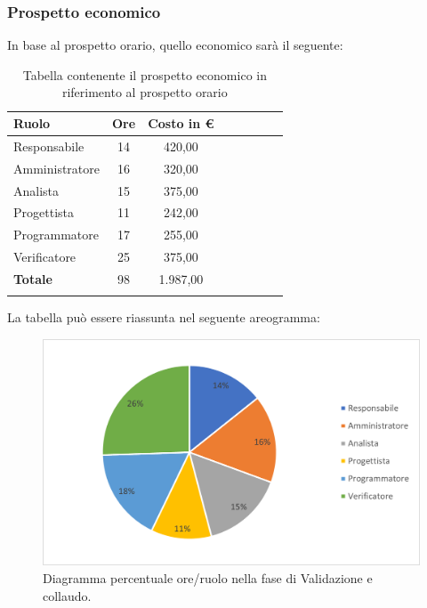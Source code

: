 \subsubsection{Prospetto economico}
In base al prospetto orario, quello economico sarà il seguente:

\begin{longtable}{|l|c|c|c|c|c|c|c|}
	\hline
	\rowcolor{lighter-grayer}
	\textbf{Ruolo}  & \textbf{Ore} & \textbf{Costo in €} \\
	\hline
	\endfirsthead

	\hline
	Responsabile    & 14           & 420,00              \\
	\hline
	\hline
	Amministratore  & 16           & 320,00              \\
	\hline
	\hline
	Analista        & 15           & 375,00              \\
	\hline
	\hline
	Progettista     & 11           & 242,00              \\
	\hline
	\hline
	Programmatore   & 17           & 255,00              \\
	\hline
	\hline
	Verificatore    & 25           & 375,00              \\
	\hline
	\hline
	\textbf{Totale} & 98           & 1.987,00            \\
	\hline
	\rowcolor{white}
	\caption{Tabella contenente il prospetto economico in riferimento al prospetto orario}
\end{longtable}
\pagebreak

La tabella può essere riassunta nel seguente areogramma:
\begin{figure}[H]
	\centering
	\includegraphics[width=0.8\linewidth]{res/images/preventivo/7-2.png}
	\caption{Diagramma percentuale ore/ruolo nella fase di Validazione e collaudo.}
	\label{fig:diagramma costi ruolo fase Validazione e collaudo.}
\end{figure}

